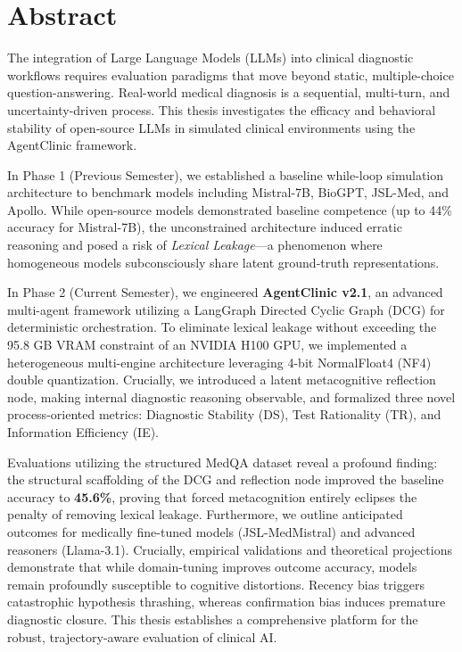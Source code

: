 \documentclass[12pt, a4paper, twoside]{report}
\begin{document}
\chapter*{Abstract}
The integration of Large Language Models (LLMs) into clinical diagnostic workflows requires evaluation paradigms that move beyond static, multiple-choice question-answering. Real-world medical diagnosis is a sequential, multi-turn, and uncertainty-driven process. This thesis investigates the efficacy and behavioral stability of open-source LLMs in simulated clinical environments using the AgentClinic framework. 

In Phase 1 (Previous Semester), we established a baseline while-loop simulation architecture to benchmark models including Mistral-7B, BioGPT, JSL-Med, and Apollo. While open-source models demonstrated baseline competence (up to 44\% accuracy for Mistral-7B), the unconstrained architecture induced erratic reasoning and posed a risk of \textit{Lexical Leakage}—a phenomenon where homogeneous models subconsciously share latent ground-truth representations. 

In Phase 2 (Current Semester), we engineered \textbf{AgentClinic v2.1}, an advanced multi-agent framework utilizing a LangGraph Directed Cyclic Graph (DCG) for deterministic orchestration. To eliminate lexical leakage without exceeding the 95.8 GB VRAM constraint of an NVIDIA H100 GPU, we implemented a heterogeneous multi-engine architecture leveraging 4-bit NormalFloat4 (NF4) double quantization. Crucially, we introduced a latent metacognitive reflection node, making internal diagnostic reasoning observable, and formalized three novel process-oriented metrics: Diagnostic Stability (DS), Test Rationality (TR), and Information Efficiency (IE). 

Evaluations utilizing the structured MedQA dataset reveal a profound finding: the structural scaffolding of the DCG and reflection node improved the baseline accuracy to \textbf{45.6\%}, proving that forced metacognition entirely eclipses the penalty of removing lexical leakage. Furthermore, we outline anticipated outcomes for medically fine-tuned models (JSL-MedMistral) and advanced reasoners (Llama-3.1). Crucially, empirical validations and theoretical projections demonstrate that while domain-tuning improves outcome accuracy, models remain profoundly susceptible to cognitive distortions. Recency bias triggers catastrophic hypothesis thrashing, whereas confirmation bias induces premature diagnostic closure. This thesis establishes a comprehensive platform for the robust, trajectory-aware evaluation of clinical AI.
\end{document}
